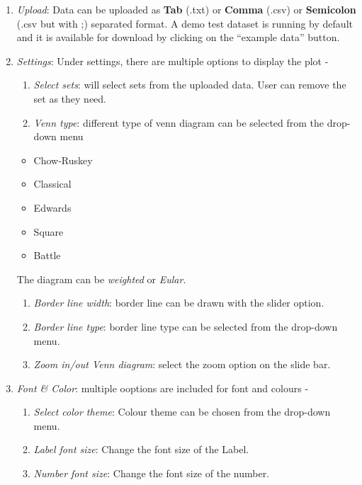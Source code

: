 \documentclass[
  a4paper,
  DIV=11,
  numbers=noendperiod,
  oneside,
  open=any]{scrreport}
\providecommand{\tightlist}{%
  \setlength{\itemsep}{0pt}\setlength{\parskip}{0pt}}\usepackage{longtable,booktabs,array}
\begin{document}
\begin{enumerate}
\def\labelenumi{\arabic{enumi}.}
\item
  \emph{Upload}: Data can be uploaded as \textbf{Tab} (.txt) or
  \textbf{Comma} (.csv) or \textbf{Semicolon} (.csv but with ;)
  separated format. A demo test dataset is running by default and it is
  available for download by clicking on the ``example data'' button.
\item
  \emph{Settings}: Under settings, there are multiple options to display
  the plot -

  \begin{enumerate}
  \def\labelenumii{\roman{enumii}.}
  \tightlist
  \item
    \emph{Select sets}: will select sets from the uploaded data. User
    can remove the set as they need.
  \item
    \emph{Venn type}: different type of venn diagram can be selected
    from the drop-down menu
  \end{enumerate}

  \begin{itemize}
  \tightlist
  \item
    Chow-Ruskey
  \item
    Classical
  \item
    Edwards
  \item
    Square
  \item
    Battle
  \end{itemize}

  The diagram can be \emph{weighted} or \emph{Eular}.

  \begin{enumerate}
  \def\labelenumii{\roman{enumii}.}
  \setcounter{enumii}{2}
  \item
    \emph{Border line width}: border line can be drawn with the slider
    option.
  \item
    \emph{Border line type}: border line type can be selected from the
    drop-down menu.
  \item
    \emph{Zoom in/out Venn diagram}: select the zoom option on the slide
    bar.
  \end{enumerate}
\item
  \emph{Font \& Color}: multiple ooptions are included for font and
  colours -

  \begin{enumerate}
  \def\labelenumii{\roman{enumii}.}
  \item
    \emph{Select color theme}: Colour theme can be chosen from the
    drop-down menu.
  \item
    \emph{Label font size}: Change the font size of the Label.
  \item
    \emph{Number font size}: Change the font size of the number.
  \end{enumerate}
\end{enumerate}
\end{document}
